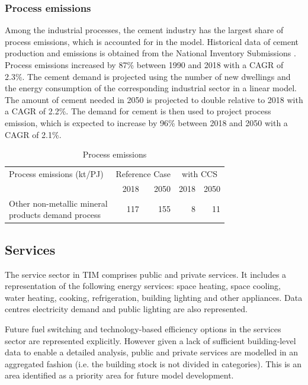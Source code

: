 \documentclass[gmd,manuscript]{copernicus}
\begin{document}
\subsubsection{Process emissions}
Among the industrial processes, the cement industry has the largest share of process emissions, which is accounted for in the model. Historical data of cement production and emissions is obtained from the National Inventory Submissions \citep{NIR2020E91:online}. Process emissions increased by 87\% between 1990 and 2018 with a CAGR of 2.3\%. The cement demand is projected using the number of new dwellings and the energy consumption of the corresponding industrial sector in a linear model. The amount of cement needed in 2050 is projected to double relative to 2018 with a CAGR of 2.2\%. The demand for cement is then used to project process emission, which is expected to increase by 96\% between 2018 and 2050 with a CAGR of 2.1\%. 

\begin{table}[htbp]
\footnotesize
 \centering
 \caption{Process emissions}
 \begin{tabular}{lrrrr}
 \hline
 Process emissions (kt/PJ) & \multicolumn{2}{c}{Reference Case} & \multicolumn{2}{c}{with CCS} \\
 & 2018 & 2050 & 2018 & 2050 \\ \hline
 \makecell{Other non-metallic mineral \\ products demand process} & 117 & 155 & 8 & 11 \\ \hline
 \end{tabular}%
 \label{table: process emissions}%
\end{table}%


\subsection{Services}
\label{ss:services}
The service sector in TIM comprises public and private services. It includes a representation of the following energy services: space heating, space cooling, water heating, cooking, refrigeration, building lighting and other appliances. Data centres electricity demand and public lighting are also represented.

Future fuel switching and technology-based efficiency options in the services sector are represented explicitly. However given a lack of sufficient building-level data to enable a detailed analysis, public and private services are modelled in an aggregated fashion (i.e. the building stock is not divided in categories). This is an area identified as a priority area for future model development. 
\end{document}
